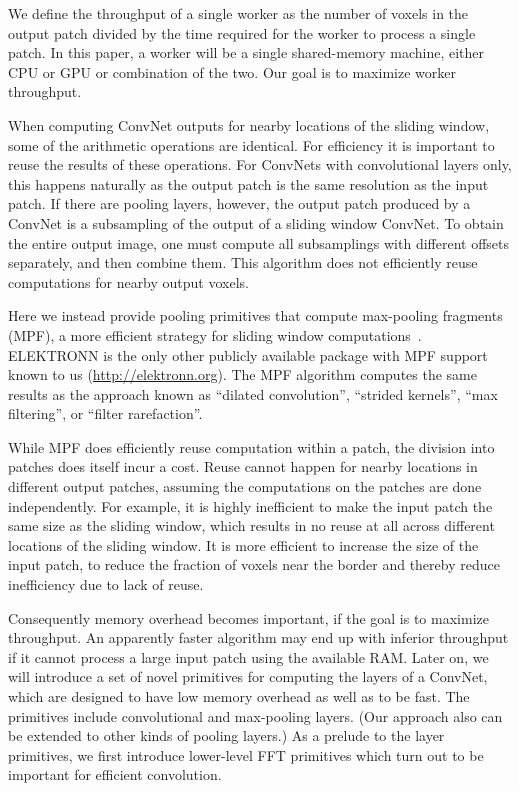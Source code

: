 \documentclass[conference]{./IEEEtran/IEEEtran}
\begin{document}
  We define the throughput of a single worker as the number of voxels
  in the output patch divided by the time required for the worker to
  process a single patch.  In this paper, a worker will be a single
  shared-memory machine, either CPU or GPU or combination of the two.
  Our goal is to maximize worker throughput.

  When computing ConvNet outputs for nearby locations of the sliding
  window, some of the arithmetic operations are identical.  For
  efficiency it is important to reuse the results of these operations.
  For ConvNets with convolutional layers only, this happens naturally
  as the output patch is the same resolution as the input patch.  If
  there are pooling layers, however, the output patch produced by a
  ConvNet is a subsampling of the output of a sliding window ConvNet.
  To obtain the entire output image, one must compute all subsamplings
  with different offsets separately, and then combine them.  This
  algorithm does not efficiently reuse computations for nearby output
  voxels.

  Here we instead provide pooling primitives that compute max-pooling
  fragments (MPF), a more efficient strategy for sliding window
  computations~\cite{giusti2013fast, masci2013fast}.  ELEKTRONN is the
  only other publicly available package with MPF support known to us
  (\url{http://elektronn.org}).  The MPF algorithm computes the same
  results as the approach known as ``dilated
  convolution''\cite{yu2015multi}, ``strided
  kernels''\cite{tschopp2015efficient}, ``max
  filtering''\cite{zlateski2015znn}, or ``filter
  rarefaction''\cite{long2015fully}.

  While MPF does efficiently reuse computation within a patch, the
  division into patches does itself incur a cost. Reuse cannot happen
  for nearby locations in different output patches, assuming the
  computations on the patches are done independently.  For example, it
  is highly inefficient to make the input patch the same size as the
  sliding window, which results in no reuse at all across different
  locations of the sliding window.  It is more efficient to increase
  the size of the input patch, to reduce the fraction of voxels near
  the border and thereby reduce inefficiency due to lack of reuse.

  Consequently memory overhead becomes important, if the goal is to
  maximize throughput.  An apparently faster algorithm may end up with
  inferior throughput if it cannot process a large input patch using
  the available RAM.  Later on, we will introduce a set of novel
  primitives for computing the layers of a ConvNet, which are designed
  to have low memory overhead as well as to be fast.  The primitives
  include convolutional and max-pooling layers.  (Our approach also
  can be extended to other kinds of pooling layers.)  As a prelude to
  the layer primitives, we first introduce lower-level FFT primitives
  which turn out to be important for efficient convolution.
\end{document}
